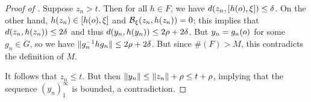 \begin{proof}[Proof of  \implies {}]
Suppose $z_n > t$. Then for all $h\in F$, we have $d(z_n,[h(o),\xi]) \leq \delta$. On the other hand, $h(z_n)\in [h(o),\xi]$ and $\operatorname{\mathcal B}_\xi(z_n,h(z_n)) = 0$; this implies that $d(z_n,h(z_n)) \leq 2\delta$ and thus $d(y_n,h(y_n)) \leq 2\rho + 2\delta$. But $y_n = g_n(o)$ for some $g_n\in G$, so we have $\|g_n^{-1}hg_n\| \leq 2\rho + 2\delta$. But since $\#(F) > M$, this contradicts the definition of $M$.

It follows that $z_n \leq t$. But then $\|y_n\| \leq \|z_n\| + \rho \leq t + \rho$, implying that the sequence $(y_n)_1^\infty$ is bounded, a contradiction.
\end{proof}







